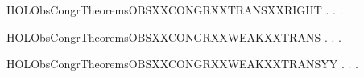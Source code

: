 \newcommand{\HOLObsCongrTheoremsOBSXXCONGRXXTRANSXXLEFT}{\UseVerbatim{HOLObsCongrTheoremsOBSXXCONGRXXTRANSXXLEFT}}
\begin{SaveVerbatim}{HOLObsCongrTheoremsOBSXXCONGRXXTRANSXXRIGHT}
\HOLTokenTurnstile{} \HOLSymConst{\HOLTokenForall{}} .
          \HOLSymConst{\HOLTokenImp{}}
       \HOLSymConst{\HOLTokenForall{}} .  \HOLTokenTransBegin{}\HOLTokenTransEnd {} \HOLSymConst{\HOLTokenImp{}} \HOLSymConst{\HOLTokenExists{}}.  \HOLTokenWeakTransBegin{}\HOLTokenWeakTransEnd {} \HOLSymConst{\HOLTokenConj{}}   
\end{SaveVerbatim}
\newcommand{\HOLObsCongrTheoremsOBSXXCONGRXXTRANSXXRIGHT}{\UseVerbatim{HOLObsCongrTheoremsOBSXXCONGRXXTRANSXXRIGHT}}
\begin{SaveVerbatim}{HOLObsCongrTheoremsOBSXXCONGRXXWEAKXXTRANS}
\HOLTokenTurnstile{} \HOLSymConst{\HOLTokenForall{}} .
          \HOLSymConst{\HOLTokenImp{}}
       \HOLSymConst{\HOLTokenForall{}} .  \HOLTokenWeakTransBegin{}\HOLTokenWeakTransEnd {} \HOLSymConst{\HOLTokenImp{}} \HOLSymConst{\HOLTokenExists{}}.  \HOLTokenWeakTransBegin{}\HOLTokenWeakTransEnd {} \HOLSymConst{\HOLTokenConj{}}   
\end{SaveVerbatim}
\newcommand{\HOLObsCongrTheoremsOBSXXCONGRXXWEAKXXTRANS}{\UseVerbatim{HOLObsCongrTheoremsOBSXXCONGRXXWEAKXXTRANS}}
\begin{SaveVerbatim}{HOLObsCongrTheoremsOBSXXCONGRXXWEAKXXTRANSYY}
\HOLTokenTurnstile{} \HOLSymConst{\HOLTokenForall{}} .
          \HOLSymConst{\HOLTokenImp{}}
       \HOLSymConst{\HOLTokenForall{}} .  \HOLTokenWeakTransBegin{}\HOLTokenWeakTransEnd {} \HOLSymConst{\HOLTokenImp{}} \HOLSymConst{\HOLTokenExists{}}.  \HOLTokenWeakTransBegin{}\HOLTokenWeakTransEnd {} \HOLSymConst{\HOLTokenConj{}}   
\end{SaveVerbatim}
